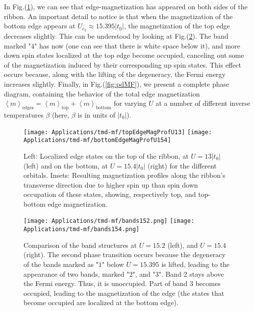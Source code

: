 In Fig.(\ref{fig:wfs1}), we can see that edge-magnetization has appeared on both sides of the ribbon.
An important detail to notice is that when the magnetization of the bottom edge appears at $U_{c_2} \approx 15.395 |t_0|$, the magnetization of the top edge decreases slightly.
This can be understood by looking at Fig.(\ref{fig:bandDegen}).
The band marked "$4$" has now  (one can see that there is white space below it), and more down spin states localized at the top edge become occupied, canceling out some of the magnetization induced by their corresponding up spin states.
This effect occurs because, along with the lifting of the degeneracy, the Fermi energy increases slightly.
Finally, in Fig.(\ref{fig:pdMF}), we present a complete phase diagram, containing the behavior of the total edge magnetization $\left\langle m \right\rangle_{\text{edges}} = \left\langle m \right\rangle_{\text{top}} + \left\langle m \right\rangle_{\text{bottom}}$ for varying $U$ at a number of different inverse temperatures $\beta$ (here, $\beta$ is in units of $| t_0 |$).
\begin{figure}[H]
\hspace{0.8cm}
\texttt{[image: Applications/tmd-mf/topEdgeMagProfU13]}
\texttt{[image: Applications/tmd-mf/bottomEdgeMagProfU154]}
	\caption[Localized edge states on the top and on the bottom of the ribbon for the different orbitals. Resulting magnetization profile along the ribbon's transverse direction due to higher spin up than spin down occupation.]{Left: Localized edge states on the top of the ribbon, at $U = 13 |t_0|$ (left) and on the bottom, at $U = 15.4 |t_0|$ (right) for the different orbitals. Insets: Resulting magnetization profiles along the ribbon's transverse direction due to higher spin up than spin down occupation of these states, showing, respectively top, and top-bottom edge magnetization.}
	\label{fig:wfs1}
\end{figure}
\vspace{-0.5cm}
\begin{figure}[H]
\hspace{0.3cm}
\texttt{[image: Applications/tmd-mf/bands152.png]}
\hspace{8mm}
\texttt{[image: Applications/tmd-mf/bands154.png]}
	\caption[Comparison of the band structures at $U = 15.2$, and $U=15.4$.]{Comparison of the band structures at $U = 15.2$ (left), and $U=15.4$ (right). The second phase transition occurs because the degeneracy of the bands marked as "$1$" below $U = 15.395$ is lifted, leading to the appearance of two bands, marked "$2$", and "$3$". Band 2 stays above the Fermi energy. Thus, it is unoccupied. Part of band 3 becomes occupied, leading to the magnetization of the edge (the states that become occupied are localized at the bottom edge).}
	\label{fig:bandDegen}
\end{figure}
